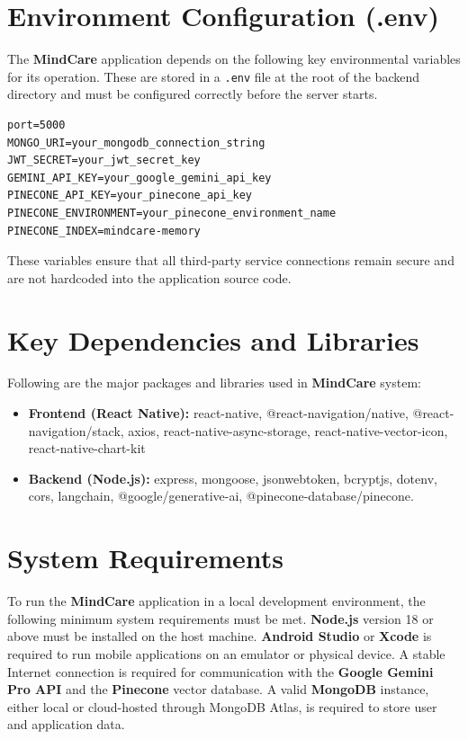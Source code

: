 \documentclass[a4paper,12pt]{report}
\begin{document}
\section{Environment Configuration (.env)}
The \textbf{MindCare} application depends on the following key environmental variables for its operation. These are stored in a \texttt{.env} file at the root of the backend directory and must be configured correctly before the server starts.

\begin{verbatim}
port=5000
MONGO_URI=your_mongodb_connection_string
JWT_SECRET=your_jwt_secret_key
GEMINI_API_KEY=your_google_gemini_api_key
PINECONE_API_KEY=your_pinecone_api_key
PINECONE_ENVIRONMENT=your_pinecone_environment_name
PINECONE_INDEX=mindcare-memory
\end{verbatim}

These variables ensure that all third-party service connections remain secure and are not hardcoded into the application source code.

\section{Key Dependencies and Libraries}
Following are the major packages and libraries used in \textbf{MindCare} system:
\begin{itemize}
    \item \textbf{Frontend (React Native):} react-native, @react-navigation/native, @react-navigation/stack, axios, react-native-async-storage, react-native-vector-icon, react-native-chart-kit
    \item \textbf{Backend (Node.js):} express, mongoose, jsonwebtoken, bcryptjs, dotenv, cors, langchain, @google/generative-ai, @pinecone-database/pinecone.
\end{itemize}

\section{System Requirements}
To run the \textbf{MindCare} application in a local development environment, the following minimum system requirements must be met. \textbf{Node.js} version 18 or above must be installed on the host machine. \textbf{Android Studio} or \textbf{Xcode} is required to run mobile applications on an emulator or physical device. A stable Internet connection is required for communication with the \textbf{Google Gemini Pro API} and the \textbf{Pinecone} vector database. A valid \textbf{MongoDB} instance, either local or cloud-hosted through MongoDB Atlas, is required to store user and application data.
\end{document}
